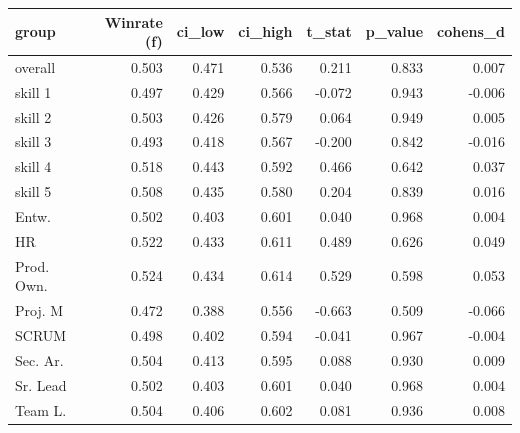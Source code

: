 \begin{tabular}{lrrrrrr}
\toprule
group & Winrate (f) & ci\_low & ci\_high & t\_stat & p\_value & cohens\_d \\
\midrule
overall & 0.503 & 0.471 & 0.536 & 0.211 & 0.833 & 0.007 \\
skill 1 & 0.497 & 0.429 & 0.566 & -0.072 & 0.943 & -0.006 \\
skill 2 & 0.503 & 0.426 & 0.579 & 0.064 & 0.949 & 0.005 \\
skill 3 & 0.493 & 0.418 & 0.567 & -0.200 & 0.842 & -0.016 \\
skill 4 & 0.518 & 0.443 & 0.592 & 0.466 & 0.642 & 0.037 \\
skill 5 & 0.508 & 0.435 & 0.580 & 0.204 & 0.839 & 0.016 \\
Entw. & 0.502 & 0.403 & 0.601 & 0.040 & 0.968 & 0.004 \\
HR & 0.522 & 0.433 & 0.611 & 0.489 & 0.626 & 0.049 \\
Prod. Own. & 0.524 & 0.434 & 0.614 & 0.529 & 0.598 & 0.053 \\
Proj. M & 0.472 & 0.388 & 0.556 & -0.663 & 0.509 & -0.066 \\
SCRUM & 0.498 & 0.402 & 0.594 & -0.041 & 0.967 & -0.004 \\
Sec. Ar. & 0.504 & 0.413 & 0.595 & 0.088 & 0.930 & 0.009 \\
Sr. Lead & 0.502 & 0.403 & 0.601 & 0.040 & 0.968 & 0.004 \\
Team L. & 0.504 & 0.406 & 0.602 & 0.081 & 0.936 & 0.008 \\
\bottomrule
\end{tabular}
